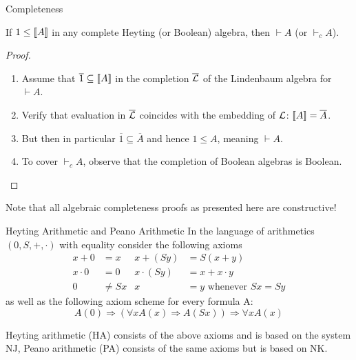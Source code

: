 \documentclass[xcolor=dvipsnames,aspectratio=169,handout]{beamer}
\renewcommand{\to}{\Rightarrow}
\begin{document}
\begin{frame}{Completeness}
	\pause
	\begin{theorem}[Completeness]
		If $1\le [\![ A]\!]$ in any complete Heyting (or Boolean) algebra, then $\vdash A$ (or $\vdash_c A$).
	\end{theorem}
	\begin{proof}
		\begin{enumerate}
			\pause
			\item
			Assume that $\overline 1\subseteq [\![ A]\!]$ in the completion $\overline {\mathcal{L}}$ of the Lindenbaum algebra for $\vdash A$.
			\pause
			\item
			Verify that evaluation in $\overline {\mathcal{L}}$ coincides with the embedding of $\mathcal{L}$: $[\![ A]\!] = \overline{ A}$.
			\pause
			\item
			But then in particular $\overline1 \subseteq \overline{A}$ and hence $1\le A$, meaning $\vdash A$.
			\pause
			\item
			To cover $\vdash_c A$, observe that the completion of Boolean algebras is Boolean.
			\qedhere
		\end{enumerate}
	\end{proof}
	
	\pause
	\vspace{0.3cm}
	Note that all algebraic completeness proofs as presented here are constructive!
\end{frame}

\begin{frame}{Heyting Arithmetic and Peano Arithmetic}
	\pause
	In the language of arithmetics $(0,S,+,\cdot)$ with equality consider the following axioms
	\begin{align*}
		x+0&=x & x+ (S y)&= S(x + y)\\
		x\cdot 0&= 0 & x \cdot (Sy) &= x+ x\cdot y\\
		0&\not= Sx & x &= y \text{ whenever } Sx = Sy
	\end{align*}
	as well as the following axiom scheme for every formula A:
	$$A(0) \to (\forall x A(x) \to A (Sx)) \to \forall x A(x)$$
	\pause
	\begin{definition}
		Heyting arithmetic (HA) consists of the above axioms and is based on the system NJ, Peano arithmetic (PA) consists of the same axioms but is based on NK.
	\end{definition}
\end{frame}
\end{document}
